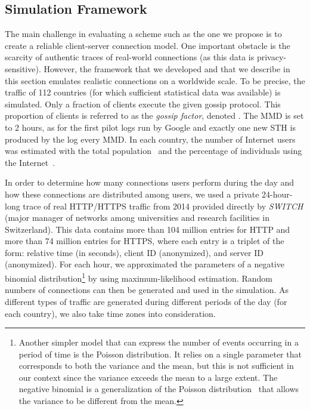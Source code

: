 \subsection{Simulation Framework}\label{sec:simulation_framework}

The main challenge in evaluating a scheme such as the one we propose is to create
a reliable client-server connection model. One important obstacle is the scarcity of
authentic traces of real-world connections (as this data is
privacy-sensitive). However, the framework that we developed and that we describe in this section
emulates realistic connections on a worldwide scale. To be precise, the traffic
of 112 countries (for which sufficient statistical data was available) is
simulated. Only a fraction of clients execute the given gossip protocol. This
proportion of clients is referred to as the \emph{gossip factor}, denoted .
The MMD is set to 2 hours, as for the first pilot logs run by Google and
exactly one new STH is produced by the log every MMD. In each country, the number
of Internet users was estimated with the total population~\cite{population2014} and
the percentage of individuals using the Internet~\cite{internet-usage2012}.

In order to determine how many connections users perform during the day and how
these connections are distributed among users, we used a private 24-hour-long trace of
real HTTP/HTTPS traffic from 2014 provided directly by \emph{SWITCH}
(major manager of networks among universities and research facilities in Switzerland).
This data contains more than 104 million entries for HTTP and more than 74 million
entries for HTTPS, where each entry is a triplet of the form: relative time
(in seconds), client ID (anonymized), and server ID (an\-onym\-ized).
For each hour, we approximated the parameters of a negative
binomial distribution\footnote{Another simpler model that can express the number
of events occurring in a period of time is the Poisson distribution. It relies
on a single parameter that corresponds to both the variance and the mean, but
this is not sufficient in our context since the variance
exceeds the mean to a large extent. The negative binomial is a
generalization of the Poisson distribution~\cite{cameron2013regression} that
allows the variance to be different from the mean.}
by using maximum-likelihood estimation.
Random numbers of connections can then be generated and used in the simulation.
As different types of traffic are generated during different periods
of the day (for each country), we also take time zones into consideration.

